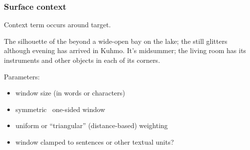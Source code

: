 \documentclass[t]{beamer} %
\begin{document}
\begin{frame}
  \frametitle{Surface context}
  
  \begin{center}
    Context term occurs  around target.
  \end{center}

  The {\color{secondary}silhouette of the} 
  {\color{secondary}beyond a wide-open} bay on {\color{secondary}the lake;
    the}  {\color{secondary}still glitters although} evening
  has arrived in Kuhmo. It's midsummer; the living room has its
  instruments and other objects in each of its corners.
  
  \gap
  Parameters:
  \begin{itemize}
  \item window size (in words or characters)
  \item symmetric \vs\ one-sided window
  \item uniform or ``triangular'' (distance-based) weighting
  \item window clamped to sentences or other textual units?
  \end{itemize}
\end{frame}
\end{document}
